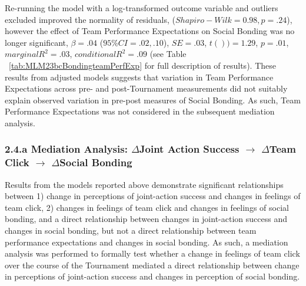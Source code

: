 Re-running the model with a log-transformed outcome variable and outliers excluded improved the normality of residuals, ($Shapiro-Wilk = 0.98, p = .24$), however the effect of Team Performance Expectations on Social Bonding was no longer significant, $\beta = .04$ ($95\% CI =  .02, .10$), $SE = .03$, $t()) = 1.29$, $p = .01$, $marginal R^2 = .03$, $conditional R^2 = .09$ (see Table ~\ref{tab:MLM23bcBondingteamPerfExp} for full description of results).  These results from adjusted models suggests that variation in Team Performance Expectations across pre- and post-Tournament measurements did not suitably explain observed variation in pre-post measures of Social Bonding.  As such, Team Performance Expectations was not considered in the subsequent mediation analysis.




\restoregeometry


  \subsubsection{2.4.a Mediation Analysis: $\Delta$Joint Action Success $\rightarrow$ $\Delta$Team Click $\rightarrow$ $\Delta$Social Bonding}

  Results from the models reported above demonstrate significant relationships between 1) change in perceptions of joint-action success and changes in feelings of team click, 2) changes in feelings of team click and changes in feelings of social bonding, and a direct relationship between changes in joint-action success and changes in social bonding, but not a direct relationship between team performance expectations and changes in social bonding. As such, a mediation analysis was performed to formally test whether a change in feelings of team click over the course of the Tournament mediated a direct relationship between change in perceptions of joint-action success and changes in perception of social bonding.\\

